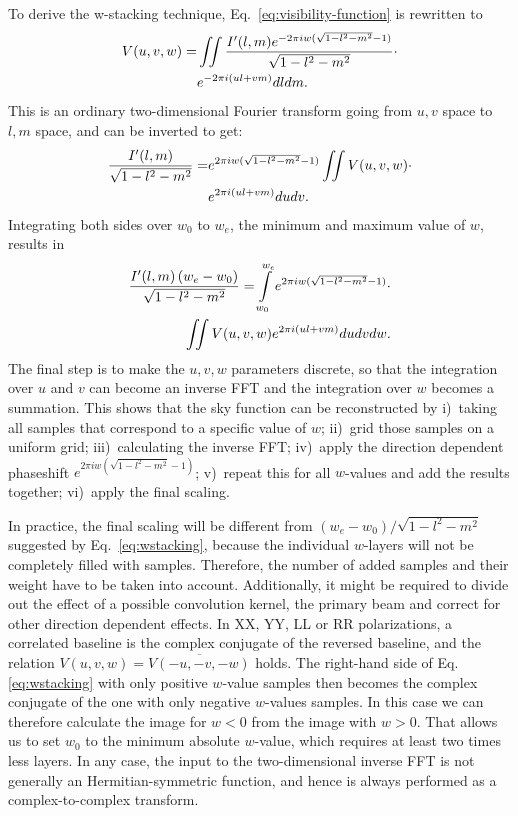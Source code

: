 \documentclass[useAMS,usenatbib]{mn2e}
\begin{document}
To derive the w-stacking technique, Eq.~\eqref{eq:visibility-function} is rewritten to
\begin{align}\notag
V(u,v,w) = & \iint \frac{I'(l,m) e^{-2\pi i w(\sqrt{1-l^2-m^2}-1)}}{\sqrt{1-l^2-m^2}} \cdot \\ \notag
& e^{-2\pi i \left(ul + vm\right)} dl dm.
\end{align}
This is an ordinary two-dimensional Fourier transform going from $u,v$ space to $l,m$ space, and can be inverted to get:
\begin{align}\notag
\frac{I'(l,m)}{\sqrt{1-l^2-m^2}} = & e^{2\pi i w(\sqrt{1-l^2-m^2}-1)} \iint V(u,v,w) \cdot \\ \notag
& e^{2\pi i \left(ul + vm\right)} du dv.
\end{align}
Integrating both sides over $w_0$ to $w_e$, the minimum and maximum value of $w$, results in
\begin{align}\notag
\frac{I'(l,m)\left(w_e - w_0\right)}{\sqrt{1-l^2-m^2}} = \int\limits_{w_0}^{w_e} e^{2\pi i w(\sqrt{1-l^2-m^2}-1)} \cdot \\ \label{eq:wstacking}
\iint V(u,v,w)  e^{2\pi i \left(ul + vm\right)} du dv dw.
\end{align}
The final step is to make the $u,v,w$ parameters discrete, so that the integration over $u$ and $v$ can become an inverse FFT and the integration over $w$ becomes a summation. This shows that the sky function can be reconstructed by i)~taking all samples that correspond to a specific value of $w$; ii)~grid those samples on a uniform grid; iii)~calculating the inverse FFT; iv)~apply the direction dependent phaseshift $e^{2\pi i w(\sqrt{1-l^2-m^2}-1)}$; v)~repeat this for all $w$-values and add the results together; vi)~apply the final scaling.

In practice, the final scaling will be different from $\left(w_e - w_0\right)/\sqrt{1-l^2-m^2}$ suggested by Eq.~\eqref{eq:wstacking}, because the individual $w$-layers will not be completely filled with samples. Therefore, the number of added samples and their weight have to be taken into account. Additionally, it might be required to divide out the effect of a possible convolution kernel, the primary beam and correct for other direction dependent effects. In XX, YY, LL or RR polarizations, a correlated baseline is the complex conjugate of the reversed baseline, and the relation $V(u,v,w)=\overline{V(-u,-v,-w)}$ holds. The right-hand side of Eq.\eqref{eq:wstacking} with only positive $w$-value samples then becomes the complex conjugate of the one with only negative $w$-values samples. In this case we can therefore calculate the image for $w<0$ from the image with $w>0$. That allows us to set $w_0$ to the minimum absolute $w$-value, which requires at least two times less layers. In any case, the input to the two-dimensional inverse FFT is not generally an Hermitian-symmetric function, and hence is always performed as a complex-to-complex transform. 
\end{document}
